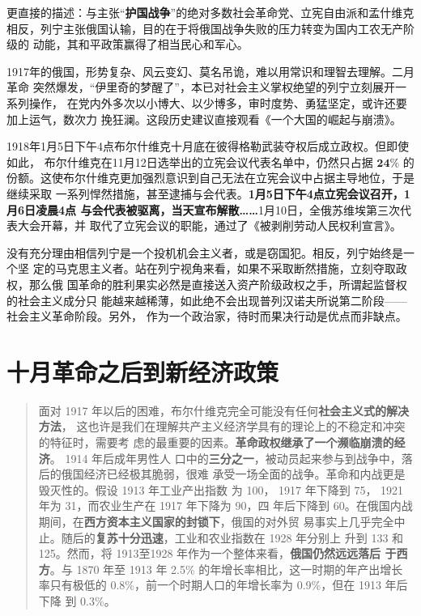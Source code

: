 更直接的描述：与主张“\textbf{护国战争}”的绝对多数社会革命党、立宪自由派和孟什维克
相反，列宁主张俄国认输，目的在于将俄国战争失败的压力转变为国内工农无产阶级的
动能，其和平政策赢得了相当民心和军心。

1917年的俄国，形势复杂、风云变幻、莫名吊诡，难以用常识和理智去理解。二月革命
突然爆发，“伊里奇的梦醒了”，本已对社会主义掌权绝望的列宁立刻展开一系列操作，
在党内外多次以小博大、以少博多，审时度势、勇猛坚定，或许还要加上运气，数次力
挽狂澜。这段历史建议直接观看《一个大国的崛起与崩溃》。

1918年1月5日下午4点布尔什维克十月底在彼得格勒武装夺权后成立政权。但即使如此，
布尔什维克在11月12日选举出的立宪会议代表名单中，仍然只占据 $\mathbf{24\%}$ 的
份额。这使布尔什维克更加强烈意识到自己无法在立宪会议中占据主导地位，于是继续采取
一系列悍然措施，甚至逮捕与会代表。\textbf{1月5日下午4点立宪会议召开，1月6日凌晨4点
  与会代表被驱离，当天宣布解散……}1月10日，全俄苏维埃第三次代表大会开幕，并
取代了立宪会议的职能，通过了《被剥削劳动人民权利宣言》。

没有充分理由相信列宁是一个投机机会主义者，或是窃国犯。相反，列宁始终是一个坚
定的马克思主义者。站在列宁视角来看，如果不采取断然措施，立刻夺取政权，那么俄
国革命的胜利果实必然是直接送入资产阶级政权之手，所谓起监督权的社会主义成分只
能越来越稀薄，如此绝不会出现普列汉诺夫所说第二阶段——社会主义革命阶段。另外，
作为一个政治家，待时而果决行动是优点而非缺点。

\section{十月革命之后到新经济政策}

\begin{quotation}
  面对 1917 年以后的困难，布尔什维克完全可能没有任何\textbf{社会主义式的解决方法}，
  这也许是我们在理解共产主义经济学具有的理论上的不稳定和冲突的特征时，需要考
  虑的最重要的因素。\textbf{革命政权继承了一个濒临崩溃的经济}。 1914 年后成年男性人
  口中的\textbf{三分之一}，被动员起来参与到战争中，落后的俄国经济已经极其脆弱，很难
  承受一场全面的战争。革命和内战更是毁灭性的。假设 1913 年工业产出指数
  为 100， 1917 年下降到 75， 1921 年为 31，而农业生产在 1917 年下降为 90，四
  年后下降到 60。在俄国内战期间，在\textbf{西方资本主义国家的封锁下}，俄国的对外贸
  易事实上几乎完全中止。随后的\textbf{复苏十分迅速}，工业和农业指数在 1928 年分别上
  升到 133 和 125。然而，将 1913至1928 年作为一个整体来看，\textbf{俄国仍然远远落后
    于西方}。与 1870 年至 1913 年 2.5\% 的年增长率相比，这一时期的年产出增长
  率只有极低的 0.8\%，前一个时期人口的年增长率为 0.9\%，但在 1913 年后下降
  到 0.3\%。

\end{quotation}

